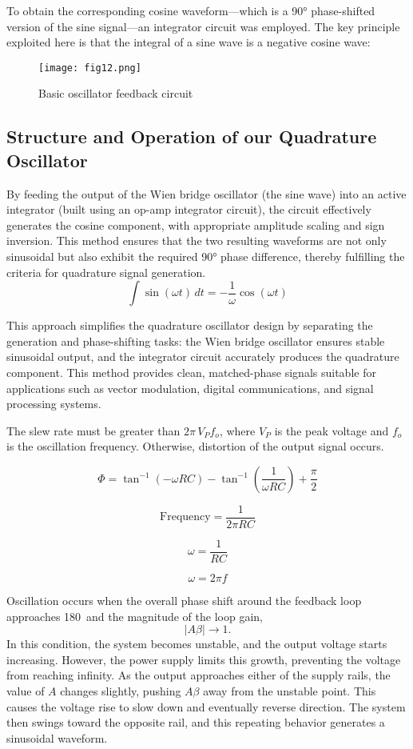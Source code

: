 \documentclass[conference]{IEEEtran}
\begin{document}
To obtain the corresponding cosine waveform—which is a 90° phase-shifted version of the sine signal—an integrator circuit was employed. The key principle exploited here is that the integral of a sine wave is a negative cosine wave:
\begin{figure}[h!]
    \centering
    \texttt{[image: fig12.png]}
    \caption{Basic oscillator feedback circuit}
\end{figure}

\subsection{Structure and Operation of our Quadrature Oscillator}
By feeding the output of the Wien bridge oscillator (the sine wave) into an active integrator (built using an op-amp integrator circuit), the circuit effectively generates the cosine component, with appropriate amplitude scaling and sign inversion. This method ensures that the two resulting waveforms are not only sinusoidal but also exhibit the required 90° phase difference, thereby fulfilling the criteria for quadrature signal generation.
\[
\int \sin(\omega t) \, dt = -\frac{1}{\omega} \cos(\omega t)
\]

This approach simplifies the quadrature oscillator design by separating the generation and phase-shifting tasks: the Wien bridge oscillator ensures stable sinusoidal output, and the integrator circuit accurately produces the quadrature component. This method provides clean, matched-phase signals suitable for applications such as vector modulation, digital communications, and signal processing systems.


The slew rate must be greater than \( 2\pi \, V_P f_o \), where \( V_P \) is the peak voltage and \( f_o \) is the oscillation frequency. Otherwise, distortion of the output signal occurs.

\[
\Phi = \tan^{-1}(-\omega RC) - \tan^{-1}\left(\frac{1}{\omega RC}\right) + \frac{\pi}{2}
\]

\[
\text{Frequency} = \frac{1}{2\pi RC}
\]

\[
\omega = \frac{1}{RC}
\]

\[
\omega = 2\pi f
\]

Oscillation occurs when the overall phase shift around the feedback loop approaches 180\textdegree\, and the magnitude of the loop gain, 
\[
\lvert A\beta \rvert \to 1.
\]
In this condition, the system becomes unstable, and the output voltage starts increasing. However, the power supply limits this growth, preventing the voltage from reaching infinity. As the output approaches either of the supply rails, the value of \( A \) changes slightly, pushing \( A\beta \) away from the unstable point. This causes the voltage rise to slow down and eventually reverse direction. The system then swings toward the opposite rail, and this repeating behavior generates a sinusoidal waveform.
\end{document}
